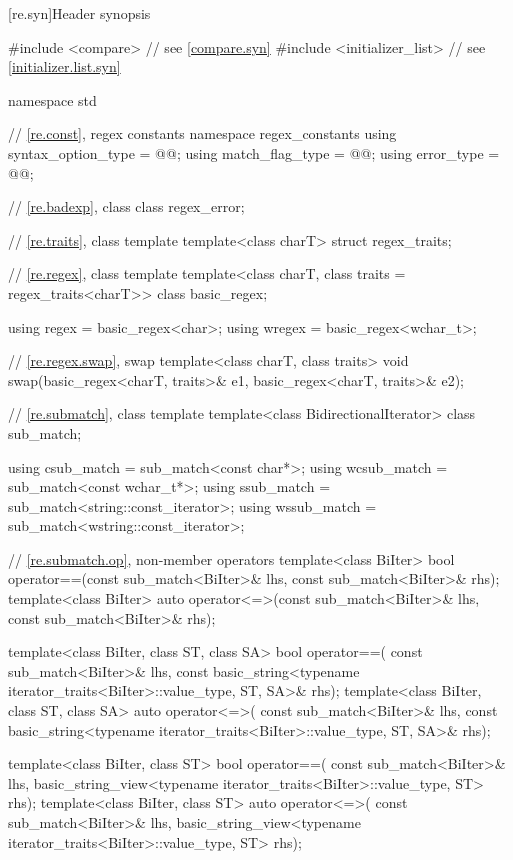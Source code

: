 [re.syn]{Header  synopsis}

%
%
%
%
\begin{codeblock}
#include <compare>              // see \ref{compare.syn}
#include <initializer_list>     // see \ref{initializer.list.syn}

namespace std {
  // \ref{re.const}, regex constants
  namespace regex_constants {
    using syntax_option_type = @@;
    using match_flag_type = @@;
    using error_type = @@;
  }

  // \ref{re.badexp}, class 
  class regex_error;

  // \ref{re.traits}, class template 
  template<class charT> struct regex_traits;

  // \ref{re.regex}, class template 
  template<class charT, class traits = regex_traits<charT>> class basic_regex;

  using regex  = basic_regex<char>;
  using wregex = basic_regex<wchar_t>;

  // \ref{re.regex.swap},  swap
  template<class charT, class traits>
    void swap(basic_regex<charT, traits>& e1, basic_regex<charT, traits>& e2);

  // \ref{re.submatch}, class template 
  template<class BidirectionalIterator>
    class sub_match;

  using csub_match  = sub_match<const char*>;
  using wcsub_match = sub_match<const wchar_t*>;
  using ssub_match  = sub_match<string::const_iterator>;
  using wssub_match = sub_match<wstring::const_iterator>;

  // \ref{re.submatch.op},  non-member operators
  template<class BiIter>
    bool operator==(const sub_match<BiIter>& lhs, const sub_match<BiIter>& rhs);
  template<class BiIter>
    auto operator<=>(const sub_match<BiIter>& lhs, const sub_match<BiIter>& rhs);

  template<class BiIter, class ST, class SA>
    bool operator==(
      const sub_match<BiIter>& lhs,
      const basic_string<typename iterator_traits<BiIter>::value_type, ST, SA>& rhs);
  template<class BiIter, class ST, class SA>
    auto operator<=>(
      const sub_match<BiIter>& lhs,
      const basic_string<typename iterator_traits<BiIter>::value_type, ST, SA>& rhs);

  template<class BiIter, class ST>
    bool operator==(
      const sub_match<BiIter>& lhs,
      basic_string_view<typename iterator_traits<BiIter>::value_type, ST> rhs);
  template<class BiIter, class ST>
    auto operator<=>(
      const sub_match<BiIter>& lhs,
      basic_string_view<typename iterator_traits<BiIter>::value_type, ST> rhs);

}
\end{codeblock}
